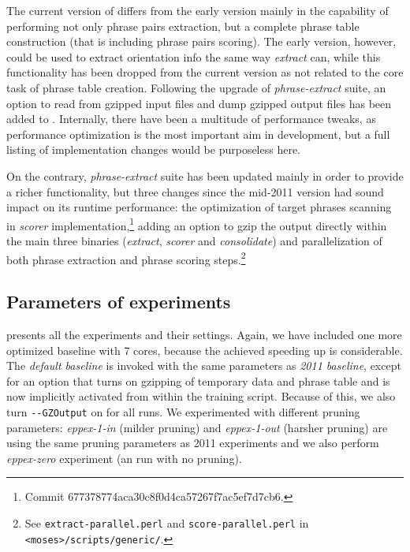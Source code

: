 The current version of \eppex{} differs from the early version mainly in the
capability of performing not only phrase pairs extraction, but a complete
phrase table construction (that is including phrase pairs scoring).
The early version, however, could be used to extract orientation info
the same way \emph{extract} can, while this functionality has been dropped
from the current version as not related to the core task of phrase table creation.
Following the upgrade of \emph{phrase-extract} suite, an option to read from
gzipped input files and dump gzipped output files has been added to \eppex{}.
Internally, there have been a multitude of performance tweaks,
as performance optimization is the most important aim in \eppex{} development,
but a full listing of implementation changes would be purposeless here.

On the contrary, \emph{phrase-extract} suite has been updated mainly in order to
provide a richer functionality, but three changes since the mid-2011 version
had sound impact on its runtime performance: the optimization of target phrases
scanning in \emph{scorer} implementation,\footnote{Commit 677378774aca30c8f0d4ca57267f7ac5ef7d7cb6.}
adding an option to gzip the output directly within the main three binaries
(\emph{extract}, \emph{scorer} and \emph{consolidate})
and parallelization of both phrase extraction and phrase scoring
steps.\footnote{See \texttt{extract-parallel.perl} and \texttt{score-parallel.perl}
in \texttt{<moses>/scripts/generic/}.}

\subsection{Parameters of experiments}

 presents all the experiments and their settings.
Again, we have included one more optimized baseline with 7 cores, because
the achieved speeding up is considerable.
The \emph{default baseline} is invoked with the same parameters as \emph{2011
baseline}, except for an option that turns on gzipping of temporary data and
phrase table and is now implicitly activated from within the training script.
Because of this, we also turn \verb|--GZOutput| on for all \eppex{} runs.
We experimented with different pruning parameters: \emph{eppex-1-in} (milder
pruning) and \emph{eppex-1-out} (harsher pruning) are using the same pruning
parameters as 2011 experiments and we also perform \emph{eppex-zero} experiment
(an \eppex{} run with no pruning).

